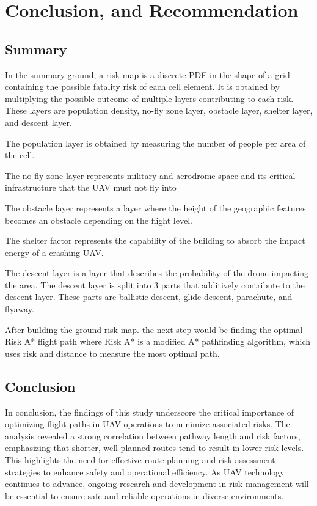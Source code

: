 \documentclass[12pt]{report}
\begin{document}
    
\chapter{Conclusion, and Recommendation}
    \section{Summary}
    In the summary ground, a risk map is a discrete PDF in the shape of a grid containing the possible fatality risk of
    each cell element. It is obtained by multiplying the possible outcome of multiple layers contributing to each risk.
    These layers are population density, no-fly zone layer, obstacle layer, shelter layer, and descent layer.
    \begin{myitemize}
    \item The population layer is obtained by measuring the number of people per area of the cell.
    \item The no-fly zone layer represents military and aerodrome space and its critical infrastructure that the UAV
    must not fly into
    \item The obstacle layer represents a layer where the height of the geographic features becomes an obstacle
    depending on the flight level.
    \item The shelter factor represents the capability of the building to absorb the impact energy of a crashing UAV.
    \item The descent layer is a layer that describes the probability of the drone impacting the area. The descent layer
    is split into 3 parts that additively contribute to the descent layer. These parts are ballistic descent, glide
    descent, parachute, and flyaway.        
    \end{myitemize}

    After building the ground risk map. the next step would be finding the optimal Risk A* flight path where Risk A* is
    a modified A* pathfinding algorithm, which uses risk and distance to measure the most optimal path.

    \section{Conclusion}
        In conclusion, the findings of this study underscore the critical importance of optimizing flight paths in UAV
        operations to minimize associated risks. The analysis revealed a strong correlation between pathway length and
        risk factors, emphasizing that shorter, well-planned routes tend to result in lower risk levels. This highlights
        the need for effective route planning and risk assessment strategies to enhance safety and operational
        efficiency. As UAV technology continues to advance, ongoing research and development in risk management will be
        essential to ensure safe and reliable operations in diverse environments.
\end{document}
